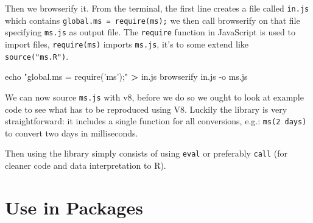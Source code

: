 \documentclass[10pt,]{krantz}
\makeatletter
\newenvironment{Shaded}{\begin{snugshade}}{\end{snugshade}}
\newcommand{\BuiltInTok}[1]{#1}
\newcommand{\CommentTok}[1]{\textcolor[rgb]{0.37,0.37,0.37}{\textit{#1}}}
\newcommand{\ExtensionTok}[1]{#1}
\newcommand{\KeywordTok}[1]{\textcolor[rgb]{0.27,0.27,0.27}{\textbf{#1}}}
\newcommand{\NormalTok}[1]{#1}
\newcommand{\OperatorTok}[1]{\textcolor[rgb]{0.43,0.43,0.43}{\textbf{#1}}}
\newcommand{\StringTok}[1]{\textcolor[rgb]{0.5,0.5,0.5}{#1}}
\newenvironment{kframe}{%
\medskip{}
\setlength{\fboxsep}{.8em}
 \def\at@end@of@kframe{}%
 \ifinner\ifhmode%
  \def\at@end@of@kframe{\end{minipage}}%
  \begin{minipage}{\columnwidth}%
 \fi\fi%
 \def\FrameCommand##1{\hskip\@totalleftmargin \hskip-\fboxsep
 \colorbox{shadecolor}{##1}\hskip-\fboxsep
     \hskip-\linewidth \hskip-\@totalleftmargin \hskip\columnwidth}%
 \MakeFramed {\advance\hsize-\width
   \@totalleftmargin\z@ \linewidth\hsize
   \@setminipage}}%
 {\par\unskip\endMakeFramed%
 \at@end@of@kframe}
\renewenvironment{Shaded}{\begin{kframe}}{\end{kframe}}
\makeatother
\begin{document}
Then we browserify it. From the terminal, the first line creates a file called \texttt{in.js} which contains \texttt{global.ms\ =\ require(\textquotesingle{}ms\textquotesingle{});} we then call browserify on that file specifying \texttt{ms.js} as output file. The \texttt{require} function in JavaScript is used to import files, \texttt{require(\textquotesingle{}ms\textquotesingle{})} imports \texttt{ms.js}, it's to some extend like \texttt{source("ms.R")}.

\begin{Shaded}
\begin{Highlighting}[]
\BuiltInTok{echo} \StringTok{"global.ms = require('ms');"} \OperatorTok{>}\NormalTok{ in.js}
\ExtensionTok{browserify}\NormalTok{ in.js -o ms.js}
\end{Highlighting}
\end{Shaded}

We can now source \texttt{ms.js} with v8, before we do so we ought to look at example code to see what has to be reproduced using V8. Luckily the library is very straightforward: it includes a single function for all conversions, e.g.: \texttt{ms(\textquotesingle{}2\ days\textquotesingle{})} to convert two days in milliseconds.

\begin{Shaded}
\end{Shaded}

Then using the library simply consists of using \texttt{eval} or preferably \texttt{call} (for cleaner code and data interpretation to R).

\begin{Shaded}
\end{Shaded}

\hypertarget{v8-pkg}{%
\section{Use in Packages}\label{v8-pkg}}
\end{document}
